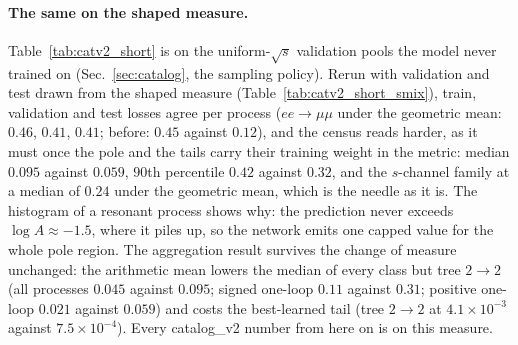\documentclass[11pt]{article}
\begin{document}
\paragraph{The same on the shaped measure.} Table~\ref{tab:catv2_short} is on the
uniform-$\sqrt s$ validation pools the model never trained on (Sec.~\ref{sec:catalog}, the
sampling policy). Rerun with validation and test drawn from the shaped measure
(Table~\ref{tab:catv2_short_smix}), train, validation and test losses agree per process
($ee\to\mu\mu$ under the geometric mean: $0.46$, $0.41$, $0.41$; before: $0.45$ against $0.12$),
and the census reads harder, as it must once the pole and the tails carry their training
weight in the metric: median $0.095$ against $0.059$, $90$th percentile $0.42$ against $0.32$,
and the $s$-channel family at a median of $0.24$ under the geometric mean, which is the needle
as it is. The histogram of a
resonant process shows why: the prediction never exceeds $\log A\approx-1.5$, where it
piles up, so the network emits one capped value for the whole pole region. The aggregation result survives the change of measure unchanged: the arithmetic mean lowers
the median of every class but tree $2\to2$ (all processes $0.045$ against $0.095$; signed
one-loop $0.11$ against $0.31$; positive one-loop $0.021$ against $0.059$) and costs the
best-learned tail (tree $2\to2$ at $4.1\times10^{-3}$ against $7.5\times10^{-4}$). Every catalog\_v2 number from here on is on this measure.
\end{document}
